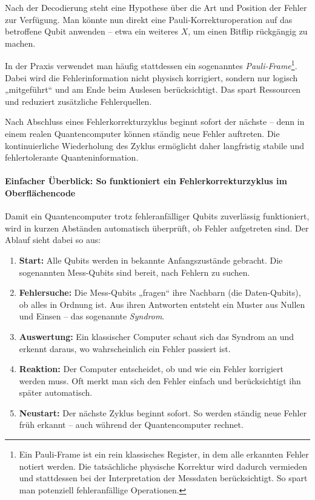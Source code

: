 Nach der Decodierung steht eine Hypothese über die Art und Position der Fehler zur Verfügung. Man könnte nun direkt eine Pauli-Korrekturoperation auf das betroffene Qubit anwenden – etwa ein weiteres \(X\), um einen Bitflip rückgängig zu machen.

In der Praxis verwendet man häufig stattdessen ein sogenanntes \emph{Pauli-Frame}\footnote{Ein Pauli-Frame ist ein rein klassisches Register, in dem alle erkannten Fehler notiert werden. Die tatsächliche physische Korrektur wird dadurch vermieden und stattdessen bei der Interpretation der Messdaten berücksichtigt. So spart man potenziell fehleranfällige Operationen.}. Dabei wird die Fehlerinformation nicht physisch korrigiert, sondern nur logisch „mitgeführt“ und am Ende beim Auslesen berücksichtigt. Das spart Ressourcen und reduziert zusätzliche Fehlerquellen.

Nach Abschluss eines Fehlerkorrekturzyklus beginnt sofort der nächste – denn in einem realen Quantencomputer können ständig neue Fehler auftreten. Die kontinuierliche Wiederholung des Zyklus ermöglicht daher langfristig stabile und fehlertolerante Quanteninformation.\\

\paragraph{Einfacher Überblick: So funktioniert ein Fehlerkorrekturzyklus im Oberflächencode}Damit ein Quantencomputer trotz fehleranfälliger Qubits zuverlässig funktioniert, wird in kurzen Abständen automatisch überprüft, ob Fehler aufgetreten sind. Der Ablauf sieht dabei so aus:

\begin{enumerate}
  \item \textbf{Start:}  
  Alle Qubits werden in bekannte Anfangszustände gebracht. Die sogenannten Mess-Qubits sind bereit, nach Fehlern zu suchen.

  \item \textbf{Fehlersuche:}  
  Die Mess-Qubits „fragen“ ihre Nachbarn (die Daten-Qubits), ob alles in Ordnung ist. Aus ihren Antworten entsteht ein Muster aus Nullen und Einsen – das sogenannte \emph{Syndrom}.

  \item \textbf{Auswertung:}  
  Ein klassischer Computer schaut sich das Syndrom an und erkennt daraus, wo wahrscheinlich ein Fehler passiert ist.

  \item \textbf{Reaktion:}  
  Der Computer entscheidet, ob und wie ein Fehler korrigiert werden muss. Oft merkt man sich den Fehler einfach und berücksichtigt ihn später automatisch.

  \item \textbf{Neustart:}  
  Der nächste Zyklus beginnt sofort. So werden ständig neue Fehler früh erkannt – auch während der Quantencomputer rechnet.
\end{enumerate}

